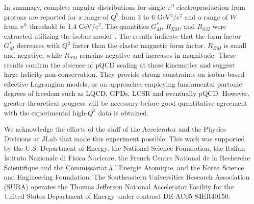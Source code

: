 \documentclass[aps,prl,twocolumn,superscriptaddress]{revtex4}
\begin{document}
In summary, complete angular distributions for single $\pi^0$ 
electroproduction from protons are reported for a range of $Q^2$ 
from $3$ to $6$  GeV$^2$/c$^2$ and a range of $W$ from $\pi^0$ 
threshold to $1.4$ GeV/c$^2$. The quantities  $G^*_M$, $R_{EM}$, 
and $R_{SM}$ were extracted utilizing the isobar model~\cite{bib:Inna}. 
The results indicate that the form factor $G_M^*$ decreases with $Q^2$ 
faster than the elastic magnetic form factor. $R_{EM}$ is small and 
negative, while $R_{SM}$ remains negative and increases in magnitude. These 
results confirm the absence of pQCD scaling at these kinematics and suggest 
large helicity non-conservation. They provide strong constraints on 
isobar-based effective Lagrangian models, or on approaches employing 
fundamental partonic degrees of freedom such as LQCD, GPDs, LCSR and 
eventually pQCD. However, greater theoretical progress will be 
necessary before good quantitative agreement with the experimental 
high-$Q^2$ data is obtained.


We acknowledge the efforts of the staff of the Accelerator and the Physics 
Divisions at JLab that made this experiment possible. This work was supported 
by the U.S. Department of Energy, the National Science Foundation, the  
Italian Istituto Nazionale di Fisica Nucleare, the French Centre National 
de la Recherche Scientifique and the Commissariat \`{a} l'Energie Atomique, 
and the Korea Science and Engineering Foundation. The Southeastern 
Universities Research Association (SURA) operates the Thomas Jefferson 
National Accelerator Facility for the United States Department of Energy 
under contract DE-AC05-84ER40150.
\end{document}
